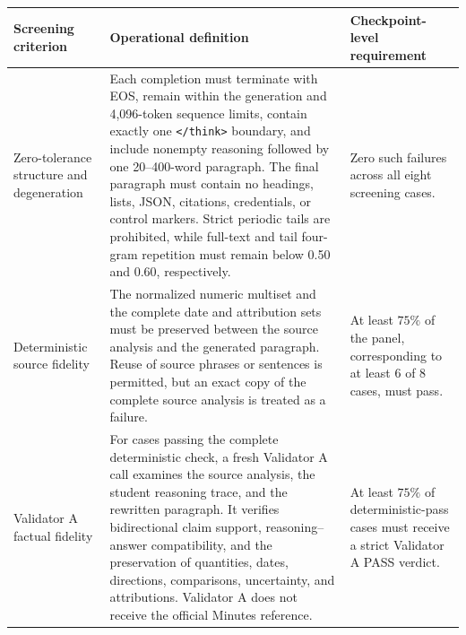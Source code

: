 \begin{table}[htbp]
    \centering
    \footnotesize
    \setlength{\tabcolsep}{4pt}
    \renewcommand{\arraystretch}{1.14}

    \begin{tabularx}{\textwidth}{@{}
        >{\raggedright\arraybackslash}p{}
        >{\raggedright\arraybackslash}X
        >{\raggedright\arraybackslash}p{}
    @{}}
        \toprule
        \textbf{Screening criterion} &
        \textbf{Operational definition} &
        \textbf{Checkpoint-level requirement} \\
        \midrule

        Zero-tolerance structure and degeneration &
        Each completion must terminate with EOS, remain within the generation
        and 4,096-token sequence limits, contain exactly one
        \texttt{\textless/think\textgreater} boundary, and include nonempty
        reasoning followed by one 20--400-word paragraph. The final paragraph
        must contain no headings, lists, JSON, citations, credentials, or
        control markers. Strict periodic tails are prohibited, while full-text
        and tail four-gram repetition must remain below 0.50 and 0.60,
        respectively. &
        Zero such failures across all eight screening cases. \\

        Deterministic source fidelity &
        The normalized numeric multiset and the complete date and attribution
        sets must be preserved between the source analysis and the generated
        paragraph. Reuse of source phrases or sentences is permitted, but an
        exact copy of the complete source analysis is treated as a failure. &
        At least $75\%$ of the panel, corresponding to at least 6 of 8 cases,
        must pass. \\

        Validator A factual fidelity &
        For cases passing the complete deterministic check, a fresh Validator A
        call examines the source analysis, the student reasoning trace, and the
        rewritten paragraph. It verifies bidirectional claim support,
        reasoning--answer compatibility, and the preservation of quantities,
        dates, directions, comparisons, uncertainty, and attributions.
        Validator A does not receive the official Minutes reference. &
        At least $75\%$ of deterministic-pass cases must receive a strict
        Validator A PASS verdict. \\


\end{tabularx}
\end{table}
